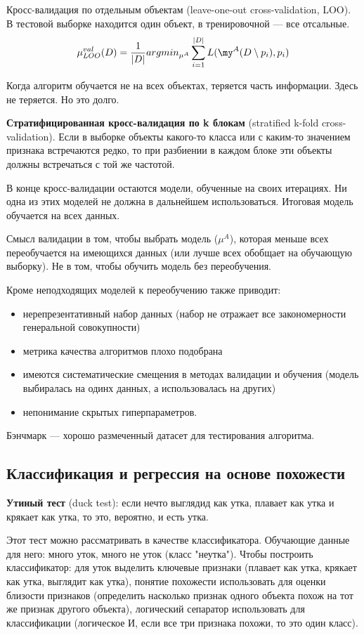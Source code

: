 Кросс-валидация по отдельным объектам (leave-one-out cross-validation, LOO).
В тестовой выборке находится один объект, в тренировочной --- все отсальные.
\[
    \mu^{val}_{LOO}(D) = \frac{1}{|D|}argmin_{\mu^A}\sum^{|D|}_{i = 1}
    L(\my^A(D \setminus p_i), p_i)
\]

Когда алгоритм обучается не на всех объектах, теряется часть информации. Здесь
не теряется. Но это долго.

\textbf{Стратифицированная кросс-валидация по k блокам} (stratified k-fold cross-validation).
Если в выборке объекты какого-то класса или с каким-то значением признака встречаются редко,
то при разбиении в каждом блоке эти объекты должны встречаться с той же частотой.

В конце кросс-валидации остаются модели, обученные на своих итерациях. Ни одна из
этих моделей не должна в дальнейшем использоваться. Итоговая модель обучается на
всех данных.

Смысл валидации в том, чтобы выбрать модель ($\mu^A$), которая меньше всех
переобучается на имеющихся данных (или лучше всех обобщает на обучающую выборку). Не в том, чтобы обучить модель без переобучения.

Кроме неподходящих моделей к переобучению также приводит:
\begin{itemize}
    \item нерепрезентативный набор данных (набор не отражает все закономерности генеральной совокупности)
    \item метрика качества алгоритмов плохо подобрана
    \item имеются систематические смещения в методах валидации и обучения (модель
      выбиралась на одинх данных, а использовалась на других)
    \item непонимание скрытых гиперпараметров.
\end{itemize}

Бэнчмарк --- хорошо размеченный датасет для тестирования алгоритма.

\subsection{Классификация и регрессия на основе похожести}

\textbf{Утиный тест} (duck test): если нечто выглядид как утка, плавает как утка и крякает как утка, то это, вероятно, и есть утка.

Этот тест можно рассматривать в качестве классификатора. Обучающие данные для
него: много уток, много не уток (класс "неутка"). Чтобы построить классификатор: для уток выделить
ключевые признаки (плавает как утка, крякает как утка, выглядит как утка), понятие похожести использовать для оценки близости признаков (определить насколько признак одного объекта похож на тот же признак другого объекта),
логический сепаратор использовать для классификации (логическое И, если все три признака похожи, то это один класс).

